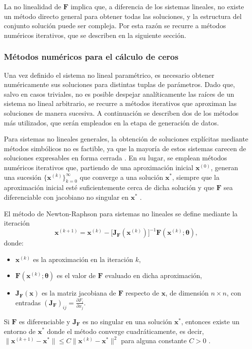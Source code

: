 \documentclass[12pt,a4paper]{article} \usepackage[utf8]{inputenc} \usepackage[spanish]{babel} \usepackage{amsmath, amssymb, amsthm} \usepackage{bm} \usepackage{float} \usepackage{longtable} \usepackage[hidelinks]{hyperref}
\newcommand{\xvec}{\mathbf{x}} \newcommand{\thetavec}{\boldsymbol{\theta}} \newcommand{\Fvec}{\mathbf{F}} \newcommand{\R}{\mathbb{R}} \newcommand{\norm}[1]{\left\lVert#1\right\rVert} \newcommand{\loss}{\mathcal{L}} \newcommand{\dataset}{\mathcal{D}} \newcommand{\jac}{\mathbf{J}}
\begin{document}
La no linealidad de \(\Fvec\) implica que, a diferencia de los sistemas lineales, no existe un método directo general para obtener todas las soluciones, y la estructura del conjunto solución puede ser compleja. Por esta razón se recurre a métodos numéricos iterativos, que se describen en la siguiente sección.

\subsubsection{Métodos numéricos para el cálculo de ceros}

Una vez definido el sistema no lineal paramétrico, es necesario obtener numéricamente sus soluciones para distintas tuplas de parámetros. Dado que, salvo en casos triviales, no es posible despejar analíticamente las raíces de un sistema no lineal arbitrario, se recurre a métodos iterativos que aproximan las soluciones de manera sucesiva. A continuación se describen dos de los métodos más utilizados, que serán empleados en la etapa de generación de datos.

Para sistemas no lineales generales, la obtención de soluciones explícitas mediante métodos simbólicos no es factible, ya que la mayoría de estos sistemas carecen de soluciones expresables en forma cerrada \cite{burden2010numerical}. En su lugar, se emplean métodos numéricos iterativos que, partiendo de una aproximación inicial \(\xvec^{(0)}\), generan una sucesión \(\{\xvec^{(k)}\}_{k=0}^{\infty}\) que converge a una solución \(\xvec^*\), siempre que la aproximación inicial esté suficientemente cerca de dicha solución y que \(\Fvec\) sea diferenciable con jacobiano no singular en \(\xvec^*\) \cite{nocedal2006numerical}.

El método de Newton-Raphson para sistemas no lineales \cite{burden2010numerical} se define mediante la iteración
\begin{equation}
\xvec^{(k+1)} = \xvec^{(k)} - \bigl[\jac_{\Fvec}(\xvec^{(k)})\bigr]^{-1} \Fvec(\xvec^{(k)}; \thetavec), \label{eq:newton}
\end{equation}
donde:
\begin{itemize}
 \item \(\xvec^{(k)}\) es la aproximación en la iteración \(k\), \item \(\Fvec(\xvec^{(k)}; \thetavec)\) es el valor de \(\Fvec\) evaluado en dicha aproximación, \item \(\jac_{\Fvec}(\xvec)\) es la matriz jacobiana de \(\Fvec\) respecto de \(\xvec\), de dimensión \(n \times n\), con entradas \((\jac_{\Fvec})_{ij} = \frac{\partial F_i}{\partial x_j}\).
\end{itemize}
Si \(\Fvec\) es diferenciable y \(\jac_{\Fvec}\) es no singular en una solución \(\xvec^*\), entonces existe un entorno de \(\xvec^*\) donde el método converge cuadráticamente, es decir, \(\|\xvec^{(k+1)} - \xvec^*\| \le C \|\xvec^{(k)} - \xvec^*\|^2\) para alguna constante \(C > 0\) \cite{nocedal2006numerical}.
\end{document}

